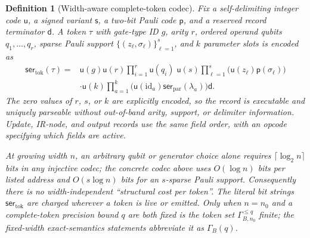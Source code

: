 \documentclass[a4paper,twocolumn,10pt,unpublished]{quantumarticle}
\newtheorem{definition}{Definition}
\begin{document}
\begin{definition}[Width-aware complete-token codec]
\label{def:token-codec}
Fix a self-delimiting integer code $\mathsf u$, a signed variant
$\mathsf s$, a two-bit Pauli code $\mathsf p$, and a reserved record
terminator $\mathsf d$.  A token $\tau$ with gate-type ID $g$, arity $r$,
ordered operand qubits $q_1,\ldots,q_r$, sparse Pauli support
$\{(z_\ell,\sigma_\ell)\}_{\ell=1}^{s}$, and $k$ parameter slots is encoded
as
\begin{equation*}
\begin{aligned}
\mathsf{ser}_{\mathrm{tok}}(\tau)
={}&\mathsf u(g)\mathsf u(r)
  \prod_{i=1}^{r}\mathsf u(q_i)\;\mathsf u(s)
  \prod_{\ell=1}^{s}
    \bigl(\mathsf u(z_\ell)\mathsf p(\sigma_\ell)\bigr)\\
 &\cdot\mathsf u(k)
  \prod_{a=1}^{k}
    \bigl(\mathsf u(\mathrm{id}_a)
           \mathsf{ser}_{\mathrm{par}}(\lambda_a)\bigr)\mathsf d .
\end{aligned}
\end{equation*}
The zero values of $r$, $s$, or $k$ are explicitly encoded, so the record is
executable and uniquely parseable without out-of-band arity, support, or
delimiter information.  Update, IR-node, and output records use the same
field order, with an opcode specifying which fields are active.

At growing width $n$, an arbitrary qubit or generator choice alone requires
$\lceil\log_2 n\rceil$ bits in any injective codec; the concrete codec above
uses $O(\log n)$ bits per listed address and $O(s\log n)$ bits for an
$s$-sparse Pauli support.  Consequently there is no width-independent
``structural cost per token''.  The literal bit strings
$\mathsf{ser}_{\mathrm{tok}}$ are charged wherever a token is live or
emitted.  Only when $n=n_0$ and a complete-token precision bound $q$ are
both fixed is the token set $\Gamma_{B,n_0}^{\leq q}$ finite; the
fixed-width exact-semantics statements abbreviate it as $\Gamma_B(q)$.
\end{definition}
\end{document}
